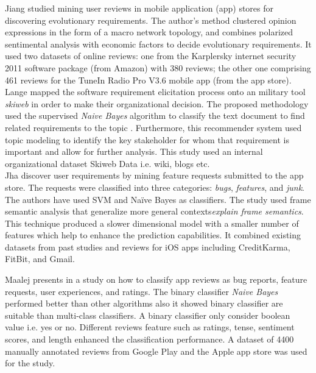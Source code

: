 Jiang \etal \cite{Jiang:2014} studied mining user reviews in mobile application
(app) stores for discovering evolutionary requirements. The author's method
clustered opinion expressions in the form of a macro network
topology, and combines polarized
sentimental analysis with economic factors to decide evolutionary
requirements. It used two datasets of online reviews: one from the
Karplersky internet security 2011 software package (from Amazon) with 380
reviews; the other one  comprising 461 reviews for the  TuneIn Radio Pro V3.6
mobile app (from the app store).\\

Lange \etal\cite{Douglas:S2008} mapped the software requirement elicitation
process onto an military tool \emph{skiweb} in order to make their organizational 
decision. The proposed methodology used the supervised
\emph{Naive Bayes} algorithm to classify the text document to find related
requirements to the topic . Furthermore, this recommender
system used topic modeling to identify the key
stakeholder for whom that requirement is important and allow for further
analysis. This study used an internal organizational
dataset Skiweb Data i.e. wiki, blogs etc.\\

Jha \etal \cite{Jha:2017} discover user requirements by mining feature requests
submitted to the app store. The requests were classified into three categories:
\emph{bugs}, \emph{features}, and \emph{junk}. The authors have used SVM and
Naïve Bayes as classifiers. The study used frame semantic analysis that
generalize more general contexts\emph{explain frame semantics}. This technique
produced a slower dimensional model with a smaller number of
features which help to enhance the prediction capabilities. It combined existing
datasets from past studies and reviews for iOS apps including CreditKarma,
FitBit, and Gmail.

Maalej presents in \cite{Maalej} a study on how to classify app reviews as bug
reports, feature requests, user experiences, and ratings. The binary classifier
\emph{Naive Bayes} performed better than other algorithms also it showed binary
classifier are suitable than multi-class
classifiers. A binary classifier only consider boolean value i.e. yes or no. Different reviews feature such as ratings,
tense, sentiment scores, and length enhanced the classification performance. A
dataset of 4400 manually annotated reviews from Google Play and the Apple app
store was used for the study.\\

